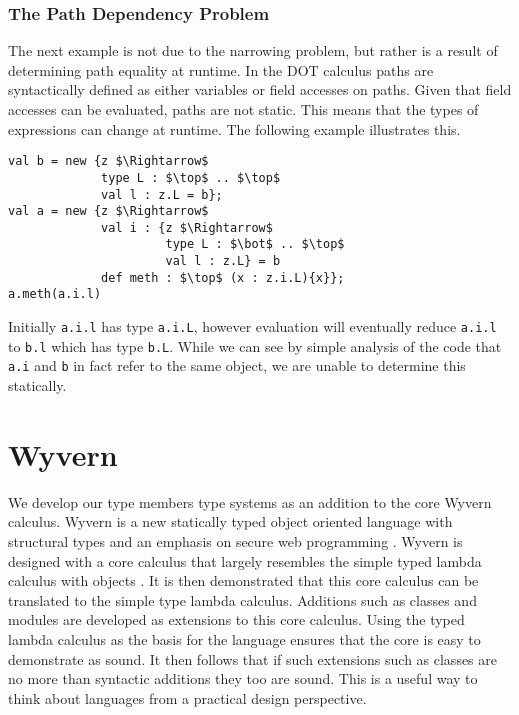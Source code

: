 \documentclass[11pt
              , a4paper
              , twoside
              , openright
              ]{report}
\numberwithin{case}{theorem}
\numberwithin{subcase}{case}
\begin{document}
\subsubsection{The Path Dependency Problem}
The next example is not due to the narrowing problem, but rather is a result of determining path equality at runtime. In the DOT calculus paths are syntactically defined as either variables or field accesses on paths. Given that field accesses can be evaluated, paths are not static. This means that the types of expressions can change at runtime. The following example illustrates this.
\begin{lstlisting}[mathescape, style=customlang]
val b = new {z $\Rightarrow$
             type L : $\top$ .. $\top$
             val l : z.L = b};
val a = new {z $\Rightarrow$
             val i : {z $\Rightarrow$
                      type L : $\bot$ .. $\top$
                      val l : z.L} = b
             def meth : $\top$ (x : z.i.L){x}};
a.meth(a.i.l)
\end{lstlisting}
Initially \verb|a.i.l| has type \verb|a.i.L|, however evaluation will eventually reduce \verb|a.i.l| to \verb|b.l| which has type \verb|b.L|. While we can see by simple analysis of the code that \verb|a.i| and \verb|b| in fact refer to the same object, we are unable to determine this statically.





\section{Wyvern}\label{s:wyvern}
We develop our type members type systems as an addition to the core Wyvern calculus. Wyvern is a new statically typed object oriented language with structural types and an emphasis on secure web programming \cite{wyvern2016}. Wyvern is designed with a core calculus that largely resembles the simple typed lambda calculus with objects \cite{Nistor:2013:WST:2489828.2489830}. It is then demonstrated that this core calculus can be translated to the simple type lambda calculus. Additions such as classes and modules are developed as extensions to this core calculus. Using the typed lambda calculus as the basis for the language ensures that the core is easy to demonstrate as sound. It then follows that if such extensions such as classes are no more than syntactic additions they too are sound. This is a useful way to think about languages from a practical design perspective.
\end{document}
